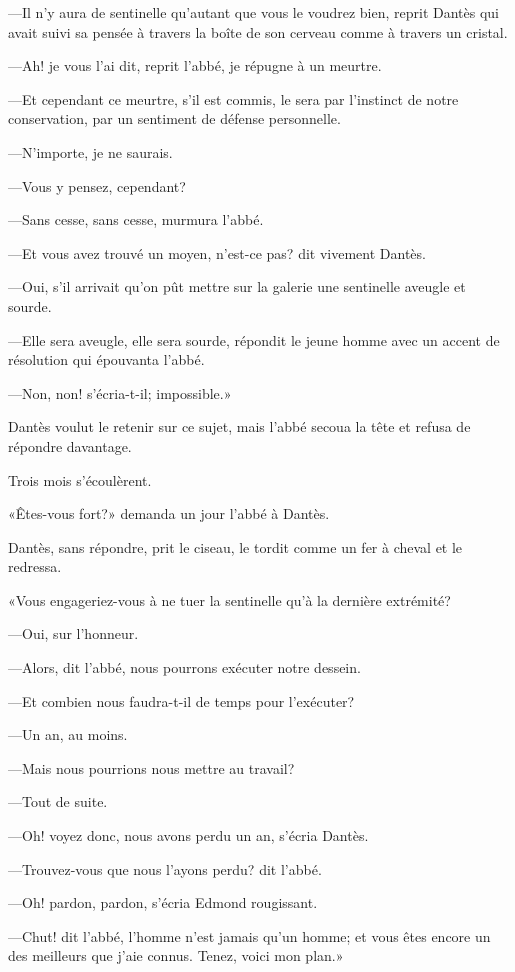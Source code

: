—Il n'y aura de sentinelle qu'autant que vous le voudrez bien, reprit Dantès qui avait suivi sa pensée à travers la boîte de son cerveau comme à travers un cristal.

—Ah! je vous l'ai dit, reprit l'abbé, je répugne à un meurtre.

—Et cependant ce meurtre, s'il est commis, le sera par l'instinct de notre conservation, par un sentiment de défense personnelle.

—N'importe, je ne saurais.

—Vous y pensez, cependant?

—Sans cesse, sans cesse, murmura l'abbé.

—Et vous avez trouvé un moyen, n'est-ce pas? dit vivement Dantès.

—Oui, s'il arrivait qu'on pût mettre sur la galerie une sentinelle aveugle et sourde.

—Elle sera aveugle, elle sera sourde, répondit le jeune homme avec un accent de résolution qui épouvanta l'abbé.

—Non, non! s'écria-t-il; impossible.»

Dantès voulut le retenir sur ce sujet, mais l'abbé secoua la tête et refusa de répondre davantage.

Trois mois s'écoulèrent.

«Êtes-vous fort?» demanda un jour l'abbé à Dantès.

Dantès, sans répondre, prit le ciseau, le tordit comme un fer à cheval et le redressa.

«Vous engageriez-vous à ne tuer la sentinelle qu'à la dernière extrémité?

—Oui, sur l'honneur.

—Alors, dit l'abbé, nous pourrons exécuter notre dessein.

—Et combien nous faudra-t-il de temps pour l'exécuter?

—Un an, au moins.

—Mais nous pourrions nous mettre au travail?

—Tout de suite.

—Oh! voyez donc, nous avons perdu un an, s'écria Dantès.

—Trouvez-vous que nous l'ayons perdu? dit l'abbé.

—Oh! pardon, pardon, s'écria Edmond rougissant.

—Chut! dit l'abbé, l'homme n'est jamais qu'un homme; et vous êtes encore un des meilleurs que j'aie connus. Tenez, voici mon plan.»

